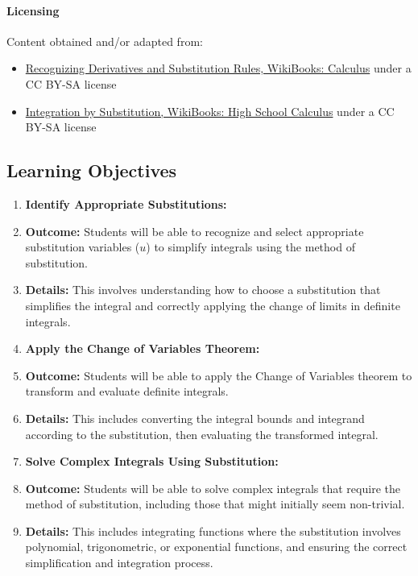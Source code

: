 \paragraph{Licensing}



Content obtained and/or adapted from:



\begin{itemize}
    \item \href{https://en.wikibooks.org/wiki/Calculus/Integration_techniques/Recognizing_Derivatives_and_the_Substitution_Rule}{Recognizing Derivatives and Substitution Rules, WikiBooks: Calculus} under a CC BY-SA license
    \item \href{https://en.wikibooks.org/wiki/High_School_Calculus/Integration_by_Substitution}{Integration by Substitution, WikiBooks: High School Calculus} under a CC BY-SA license
\end{itemize}

\subsection{Learning Objectives}

\begin{enumerate}
    \item \textbf{Identify Appropriate Substitutions:}
    \item \textbf{Outcome:} Students will be able to recognize and select appropriate substitution variables ($u$) to simplify integrals using the method of substitution.
    \item \textbf{Details:} This involves understanding how to choose a substitution that simplifies the integral and correctly applying the change of limits in definite integrals.
    \item \textbf{Apply the Change of Variables Theorem:}
    \item \textbf{Outcome:} Students will be able to apply the Change of Variables theorem to transform and evaluate definite integrals.
    \item \textbf{Details:} This includes converting the integral bounds and integrand according to the substitution, then evaluating the transformed integral.
    \item \textbf{Solve Complex Integrals Using Substitution:}
    \item \textbf{Outcome:} Students will be able to solve complex integrals that require the method of substitution, including those that might initially seem non-trivial.
    \item \textbf{Details:} This includes integrating functions where the substitution involves polynomial, trigonometric, or exponential functions, and ensuring the correct simplification and integration process.
\end{enumerate}

